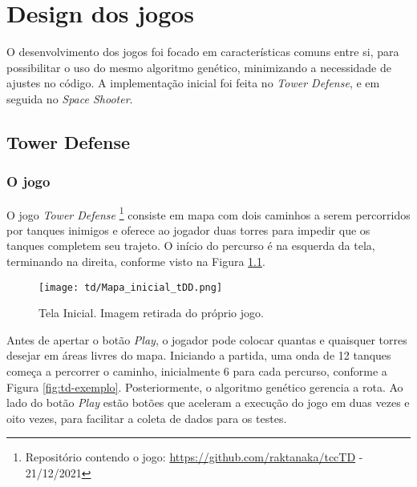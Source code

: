 


\chapter{Design dos jogos}
\label{cap:mecanica-dos-jogos}

O desenvolvimento dos jogos foi focado em características comuns entre si, para possibilitar o uso do mesmo algoritmo genético, minimizando a necessidade de ajustes no código. A implementação inicial foi feita no \textit{Tower Defense}, e em seguida no \textit{Space Shooter}.

\section{Tower Defense}
\label{sec:mj-td}

\subsection{O jogo}
\label{sub-sec:jogo-td}

O jogo \textit{Tower Defense} \footnote{Repositório contendo o jogo: { \url{https://github.com/raktanaka/tccTD} - 21/12/2021}} consiste em mapa com dois caminhos a serem percorridos por tanques inimigos e oferece ao jogador duas torres para impedir que os tanques completem seu trajeto. O início do percurso é na esquerda da tela, terminando na direita, conforme visto na Figura \ref{fig:td-inicial}.

\begin{figure}
  \centering
  \texttt{[image: td/Mapa\_inicial\_tDD.png]}
  \caption{Tela Inicial. Imagem retirada do próprio jogo.\label{fig:td-inicial}}
\end{figure}

Antes de apertar o botão \textit{Play}, o jogador pode colocar quantas e quaisquer torres desejar em áreas livres do mapa. Iniciando a partida, uma onda de 12 tanques começa a percorrer o caminho, inicialmente 6 para cada percurso, conforme a Figura \ref{fig:td-exemplo}. Posteriormente, o algoritmo genético gerencia a rota. Ao lado do botão \textit{Play} estão botões que aceleram a execução do jogo em duas vezes e oito vezes, para facilitar a coleta de dados para os testes.

